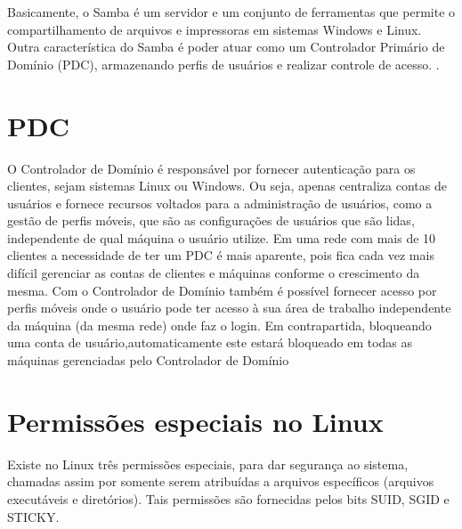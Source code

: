 Basicamente, o Samba é um servidor e um conjunto de ferramentas que permite o compartilhamento de arquivos e impressoras em sistemas Windows e Linux. Outra característica do Samba é poder atuar como um Controlador Primário de Domínio (PDC), armazenando perfis de usuários e realizar controle de acesso. \cite{FOCA}.

\section{PDC}

O Controlador de Domínio é responsável por fornecer autenticação para os clientes, sejam sistemas Linux ou Windows. Ou seja, apenas centraliza contas de usuários e fornece recursos voltados para a administração de usuários, como a gestão de perfis móveis, que são as configurações de usuários que são lidas, independente de qual máquina o usuário utilize. Em uma rede com mais de 10 clientes a necessidade de ter um PDC é mais aparente, pois fica cada vez mais difícil gerenciar as contas de clientes e máquinas conforme o crescimento da mesma. Com o Controlador de Domínio também é possível fornecer acesso por perfis móveis onde o usuário pode ter acesso à sua área de trabalho independente da máquina (da mesma rede) onde faz o login. Em contrapartida, bloqueando uma conta de usuário,automaticamente este estará bloqueado em todas as máquinas gerenciadas pelo Controlador de Domínio \cite{MORIMOTO}

\section{Permissões especiais no Linux}

Existe no Linux três permissões especiais, para dar segurança ao sistema, chamadas assim por somente serem atribuídas a arquivos específicos (arquivos executáveis e diretórios). Tais permissões são fornecidas pelos bits SUID, SGID e STICKY.

